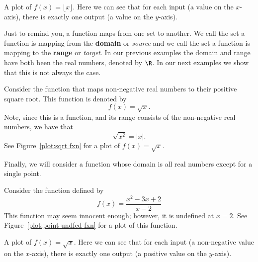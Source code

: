 \begin{marginfigure}[0in]
\caption{A plot of $f(x)=\lfloor x\rfloor$. Here we can see that for each input (a
  value on the $x$-axis), there is exactly one output (a value on the
  $y$-axis).}
\label{plot:greatest-integer fxn}
\end{marginfigure}


Just to remind you, a function maps from one set to another. We call
the set a function is mapping from the \textbf{domain}
or \textit{source} and we call the set a function is mapping to the
\textbf{range} or \textit{target}.  In our previous
examples the domain and range have both been the real numbers, denoted
by $\R$. In our next examples we show that this is not always the
case.


\begin{example}
Consider the function that maps non-negative real numbers to their positive square root. This function is denoted by 
\[
f(x) = \sqrt{x}.
\]
Note, since this is a function, and its range consists of the non-negative real numbers, we have that 
\[
\sqrt{x^2} = |x|.
\]
See Figure~\ref{plot:sqrt fxn} for a plot of $f(x) = \sqrt{x}$.
\end{example}

Finally, we will consider a function whose domain is all real numbers
except for a single point.

\begin{example}
Consider the function defined by 
\[
f(x) = \frac{x^2 - 3x + 2}{x-2}
\]
This function may seem innocent enough; however, it is undefined at
$x=2$. See Figure~\ref{plot:point undfed fxn} for a plot of this function.
\end{example}

\begin{marginfigure}[0in]
\caption{A plot of $f(x)=\sqrt{x}$. Here we can see that for each
  input (a non-negative value on the $x$-axis), there is exactly one
  output (a positive value on the $y$-axis).}
\label{plot:sqrt fxn}
\end{marginfigure}


